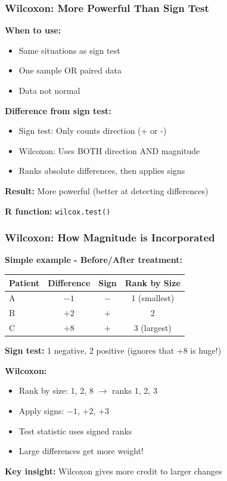 \documentclass{beamer}
\begin{document}
\begin{frame}
\frametitle{Wilcoxon: More Powerful Than Sign Test}
\textbf{When to use:}
\begin{itemize}
\item Same situations as sign test
\item One sample OR paired data
\item Data not normal
\end{itemize}

\vspace{0.5cm}
\textbf{Difference from sign test:}
\begin{itemize}
\item Sign test: Only counts direction (+ or -)
\item Wilcoxon: Uses BOTH direction AND magnitude
\item Ranks absolute differences, then applies signs
\end{itemize}

\vspace{0.5cm}
\textbf{Result:} More powerful (better at detecting differences)

\vspace{0.3cm}
\textbf{R function:} \texttt{wilcox.test()}
\end{frame}

\begin{frame}
\frametitle{Wilcoxon: How Magnitude is Incorporated}
\textbf{Simple example - Before/After treatment:}

\vspace{0.3cm}
\begin{small}
\begin{tabular}{lccc}
\textbf{Patient} & \textbf{Difference} & \textbf{Sign} & \textbf{Rank by Size} \\
\hline
A & $-1$ & $-$ & 1 (smallest) \\
B & $+2$ & $+$ & 2 \\
C & $+8$ & $+$ & 3 (largest) \\
\end{tabular}
\end{small}

\vspace{0.3cm}
\textbf{Sign test:} 1 negative, 2 positive (ignores that +8 is huge!)

\textbf{Wilcoxon:}
\begin{itemize}
\item Rank by size: 1, 2, 8 $\rightarrow$ ranks 1, 2, 3
\item Apply signs: $-1$, $+2$, $+3$
\item Test statistic uses signed ranks
\item Large differences get more weight!
\end{itemize}

\textbf{Key insight:} Wilcoxon gives more credit to larger changes
\end{frame}
\end{document}
